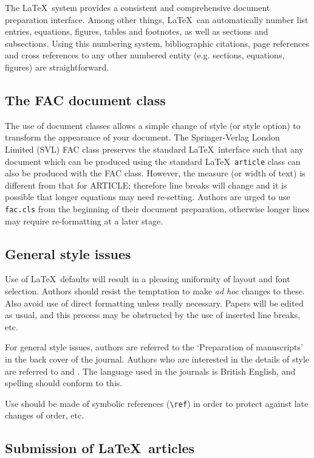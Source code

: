 \documentclass{fac}
\begin{document}
The \LaTeX\ system provides a consistent and comprehensive document preparation
interface. Among other things, \LaTeX\ can automatically number list
entries, equations, figures, tables and footnotes, as well as sections and
subsections. Using this numbering system, bibliographic citations, page
references and cross references to any other numbered entity (e.g. sections,
equations, figures) are straightforward.

\subsection{The FAC document class}

The use of document classes allows a simple change of style (or style option)
to transform the appearance of your document. The Springer-Verlag London Limited
(SVL) FAC class preserves the standard \LaTeX\ interface such that any document
which can be produced using the standard \LaTeX\ \verb"article" class can also be
produced with the FAC class.
However, the measure (or width of text) is different from that
for ARTICLE; therefore line breaks will change and it is possible that
longer equations may need re-setting.
Authors are urged to use \verb"fac.cls" from the beginning of their document
preparation, otherwise longer lines may require re-formatting at a later stage.

\subsection{General style issues}

Use of \LaTeX\ defaults will result in a pleasing uniformity of layout
and font selection. Authors should resist the temptation to make
\emph{ad hoc} changes to these. Also avoid use of direct formatting unless
really necessary. Papers will be edited as usual, and this process may be
obstructed by the use of inserted line breaks, etc.

For general style issues, authors are referred to the `Preparation of
manuscripts' in the back cover of the journal. Authors who are interested in
the details of style are referred to \cite{But:Copy} and \cite{Chicago}. The
language used in the journals is British English, and spelling should conform
to this.

Use should be made of symbolic references (\verb"\ref") in order to
protect against late changes of order, etc.

\subsection{Submission of \LaTeX\ articles}
\end{document}
